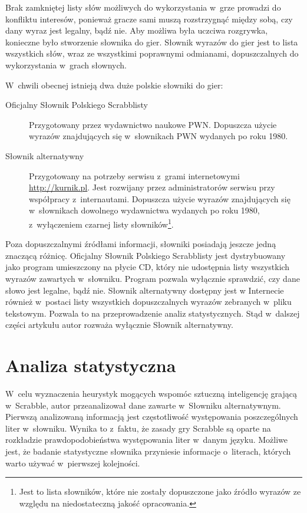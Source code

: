 \documentclass[a4paper,twocolumn,12pt]{article}
\begin{document}
Brak zamkniętej listy słów możliwych do wykorzystania w~grze prowadzi do konfliktu interesów, ponieważ gracze sami muszą rozstrzygnąć między sobą, czy dany wyraz jest legalny, bądź nie. Aby możliwa była uczciwa rozgrywka, konieczne było stworzenie słownika do gier. Słownik wyrazów do gier jest to lista wszystkich słów, wraz ze wszystkimi poprawnymi odmianami, dopuszczalnych do wykorzystania w~grach słownych. \cite{game_dictionary_definition}

W~chwili obecnej istnieją dwa duże polskie słowniki do gier:

\begin{description}
 \item [Oficjalny Słownik Polskiego Scrabblisty] Przygotowany przez wydawnictwo naukowe PWN. Dopuszcza użycie wyrazów znajdujących się w~słownikach PWN wydanych po roku 1980.
 \item[Słownik alternatywny] Przygotowany na potrzeby serwisu z~grami internetowymi \url{http://kurnik.pl}. Jest rozwijany przez administratorów serwisu przy współpracy z~internautami. Dopuszcza użycie wyrazów znajdujących się w~słownikach dowolnego wydawnictwa wydanych po roku 1980, z~wyłączeniem czarnej listy słowników\footnote{Jest to lista słowników, które nie zostały dopuszczone jako źródło wyrazów ze względu na niedostateczną jakość opracowania.}. 
\end{description}

Poza dopuszczalnymi źródłami informacji, słowniki posiadają jeszcze jedną znaczącą różnicę. Oficjalny Słownik Polskiego Scrabblisty jest dystrybuowany jako program umieszczony na płycie CD, który nie udostępnia listy wszystkich wyrazów zawartych w~słowniku. Program pozwala wyłącznie sprawdzić, czy dane słowo jest legalne, bądź nie. Słownik alternatywny dostępny jest w Internecie również w~postaci listy wszystkich dopuszczalnych wyrazów zebranych w~pliku tekstowym. Pozwala to na przeprowadzenie analiz statystycznych. Stąd w~dalszej części artykułu autor rozważa wyłącznie Słownik alternatywny.

\section*{Analiza statystyczna}

W~celu wyznaczenia heurystyk mogących wspomóc sztuczną inteligencję grającą w~Scrabble, autor przeanalizował dane zawarte w~Słowniku alternatywnym. Pierwszą analizowaną informacją jest częstotliwość występowania poszczególnych liter w~słowniku. Wynika to z~faktu, że zasady gry Scrabble są oparte na rozkładzie prawdopodobieństwa występowania liter w~danym języku. Możliwe jest, że badanie statystyczne słownika przyniesie informacje o~literach, których warto używać w~pierwszej kolejności.
\end{document}
